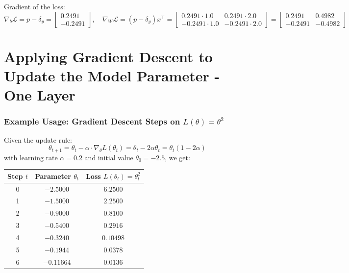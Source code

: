 Gradient of the loss:
\[
\nabla_b \mathcal{L} = p - \delta_y = 
\begin{bmatrix} 0.2491 \\ -0.2491 \end{bmatrix}, \quad
\nabla_W \mathcal{L} = (p - \delta_y)x^\top =
\begin{bmatrix}
	0.2491 \cdot 1.0 & 0.2491 \cdot 2.0 \\
	-0.2491 \cdot 1.0 & -0.2491 \cdot 2.0
\end{bmatrix}
=
\begin{bmatrix}
	0.2491 & 0.4982 \\
	-0.2491 & -0.4982
\end{bmatrix}
\]



\section{Applying Gradient Descent to Update the Model Parameter - One Layer}
\subsubsection*{Example Usage: Gradient Descent Steps on $L(\theta) = \theta^2$}

Given the update rule:
\[
\theta_{t+1} = \theta_t - \alpha \cdot \nabla_\theta L(\theta_t) = \theta_t - 2\alpha \theta_t = \theta_t(1 - 2\alpha)
\]
with learning rate $\alpha = 0.2$ and initial value $\theta_0 = -2.5$, we get:

\begin{center}
	\begin{tabular}{@{}ccc@{}}
		\toprule
		\textbf{Step $t$} & \textbf{Parameter $\theta_t$} & \textbf{Loss $L(\theta_t) = \theta_t^2$} \\
		\midrule
		0 & $-2.5000$ & $6.2500$ \\
		1 & $-1.5000$ & $2.2500$ \\
		2 & $-0.9000$ & $0.8100$ \\
		3 & $-0.5400$ & $0.2916$ \\
		4 & $-0.3240$ & $0.10498$ \\
		5 & $-0.1944$ & $0.0378$ \\
		6 & $-0.11664$ & $0.0136$ \\
		\bottomrule
	\end{tabular}
\end{center}


